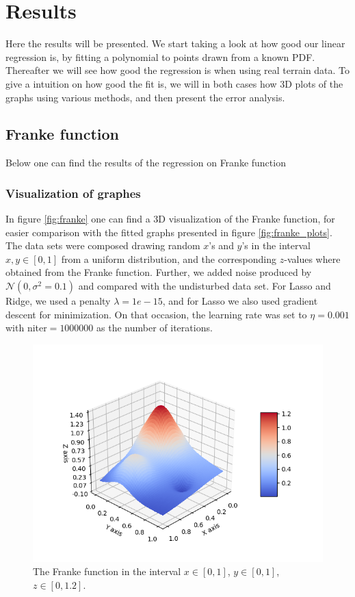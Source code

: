 \section{Results} \label{sec:results}
Here the results will be presented. We start taking a look at how good our linear regression is, by fitting a polynomial to points drawn from a known PDF. Thereafter we will see how good the regression is when using real terrain data. To give a intuition on how good the fit is, we will in both cases how 3D plots of the graphs using various methods, and then present the error analysis. 

\subsection{Franke function}
Below one can find the results of the regression on Franke function

\subsubsection{Visualization of graphes}
In figure \eqref{fig:franke} one can find a 3D visualization of the Franke function, for easier comparison with the fitted graphs presented in figure \eqref{fig:franke_plots}. The data sets were composed drawing random $x$'s and $y$'s in the interval $x,y\in[0,1]$ from a uniform distribution, and the corresponding $z$-values where obtained from the Franke function. Further, we added noise produced by $\mathcal{N}(0, \sigma^2=0.1)$ and compared with the undisturbed data set. For Lasso and Ridge, we used a penalty $\lambda=1e-15$, and for Lasso we also used gradient descent for minimization. On that occasion, the learning rate was set to $\eta=0.001$ with niter$=1000000$ as the number of iterations. 
 \begin{figure} [h]
 	\centering
 	\includegraphics[scale=0.8]{../plots/franke.png}
 	\caption{The Franke function in the interval $x\in[0,1]$, $y\in[0,1]$, $z\in[0, 1.2]$.}
 	\label{fig:franke}
 \end{figure}

